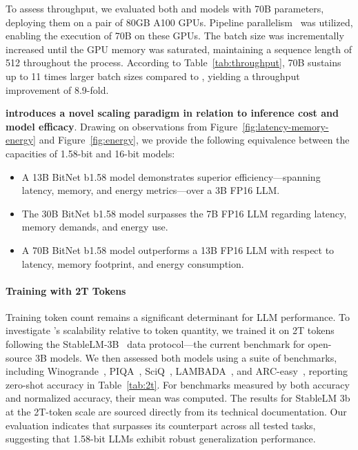 To assess throughput, we evaluated both  and  models with 70B parameters, deploying them on a pair of 80GB A100 GPUs. Pipeline parallelism~\cite{gpipe} was utilized, enabling the execution of  70B on these GPUs. The batch size was incrementally increased until the GPU memory was saturated, maintaining a sequence length of 512 throughout the process. According to Table~\ref{tab:throughput},  70B sustains up to 11 times larger batch sizes compared to , yielding a throughput improvement of 8.9-fold.

\textbf{ introduces a novel scaling paradigm in relation to inference cost and model efficacy}. Drawing on observations from Figure~\ref{fig:latency-memory-energy} and Figure~\ref{fig:energy}, we provide the following equivalence between the capacities of 1.58-bit and 16-bit models:

\begin{itemize}
    \item A 13B BitNet b1.58 model demonstrates superior efficiency—spanning latency, memory, and energy metrics—over a 3B FP16 LLM.
    \item The 30B BitNet b1.58 model surpasses the 7B FP16 LLM regarding latency, memory demands, and energy use.
    \item A 70B BitNet b1.58 model outperforms a 13B FP16 LLM with respect to latency, memory footprint, and energy consumption.
\end{itemize}

\paragraph{Training with 2T Tokens}

Training token count remains a significant determinant for LLM performance. To investigate 's scalability relative to token quantity, we trained it on 2T tokens following the StableLM-3B~\cite{StableLM-3B-4E1T} data protocol—the current benchmark for open-source 3B models. We then assessed both models using a suite of benchmarks, including Winogrande~\cite{winoGrande}, PIQA~\cite{piqa}, SciQ~\cite{sciq}, LAMBADA~\cite{lambada}, and ARC-easy~\cite{arc}, reporting zero-shot accuracy in Table~\ref{tab:2t}. For benchmarks measured by both accuracy and normalized accuracy, their mean was computed. The results for StableLM 3b at the 2T-token scale are sourced directly from its technical documentation. Our evaluation indicates that  surpasses its counterpart across all tested tasks, suggesting that 1.58-bit LLMs exhibit robust generalization performance.

